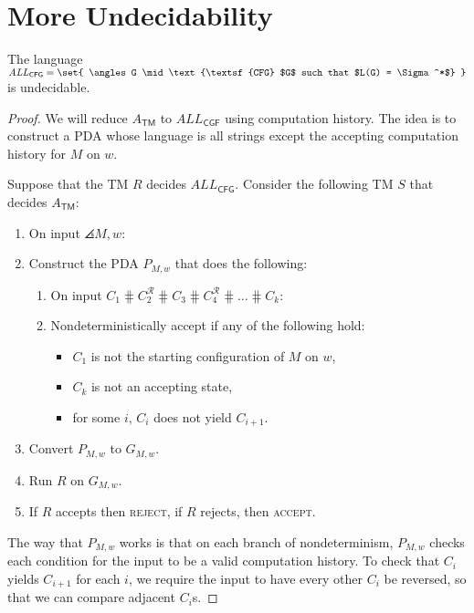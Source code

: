\documentclass{standalone}
\begin{document}
\section{More Undecidability}
\begin{proposition}
  The language \(\mathit{ALL}_{\textsf{CFG}} = \set{
    \angles G \mid \text{\textsf{CFG} $G$ such that $L(G) = \Sigma^*$}
  }\) is undecidable.
\end{proposition}
\begin{proof}
  We will reduce \(A_{\textsf{TM}}\) to \(\textit{ALL}_{\textsf{CGF}}\)
  using computation history.
  The idea is to construct a \textsf{PDA} whose language is
  all strings except the accepting computation history for \(M\) on \(w\).

  Suppose that the \textsf{TM} \(R\) decides \(\textit{ALL}_{\textsf{CFG}}\).
  Consider the following \textsf{TM} \(S\) that decides \(A_{\textsf{TM}}\):
  \begin{enumerate}[start=0]
    \item On input \(\angles{M, w}\):
    \item Construct the \textsf{PDA} \(P_{M, w}\) that does the following:
    \begin{enumerate}[(1), start=0, nosep]
      \item On input \(C_1 \hash
                       C_2^{\mathcal R} \hash
                       C_3 \hash
                       C_4^{\mathcal R} \hash \dots \hash C_k\):
      \item Nondeterministically accept if any of the following hold:
      \begin{itemize}[nosep]
        \item \(C_1\) is not the starting configuration of \(M\) on \(w\),
        \item \(C_k\) is not an accepting state,
        \item for some \(i\), \(C_i\) does not yield \(C_{i + 1}\).
      \end{itemize}
    \end{enumerate}
    \item Convert \(P_{M, w}\) to \(G_{M, w}\).
    \item Run \(R\) on \(G_{M, w}\).
    \item If \(R\) accepts then \textsc{reject},
          if \(R\) rejects, then \textsc{accept}.
  \end{enumerate}

  The way that \(P_{M, w}\) works is that on each branch of nondeterminism,
  \(P_{M, w}\) checks each condition for
  the input to be a valid computation history.
  To check that \(C_i\) yields \(C_{i + 1}\) for each \(i\),
  we require the input to have every other \(C_i\) be reversed,
  so that we can compare adjacent \(C_i\)s.
\end{proof}
\end{document}
